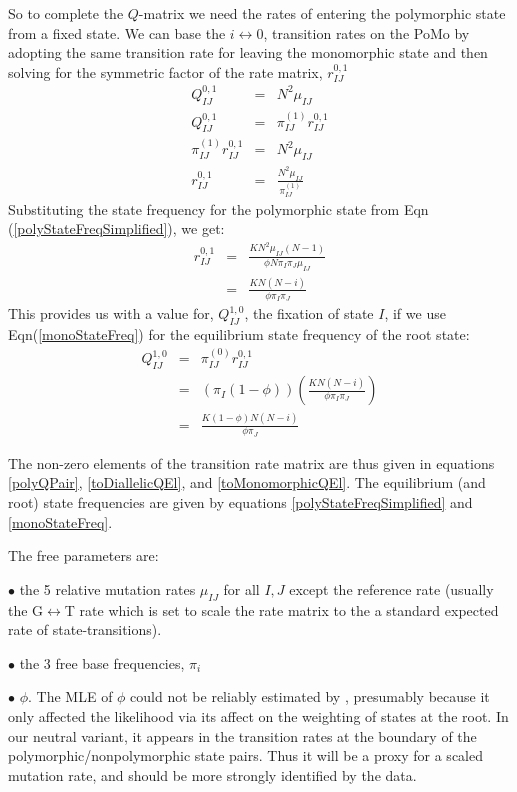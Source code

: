 \documentclass{llncs}
\newcommand{\polyProb}{\ensuremath{\phi}}}
\newcommand{\Knorm}{\ensuremath{K}}}
\newcommand{\pomo}{PoMo\xspace}
\begin{document}
So to complete the $Q$-matrix we need the rates of entering the polymorphic state from a fixed state.
We can base the $i\leftrightarrow 0$, transition rates on the \pomo by adopting 
    the same transition rate for leaving the monomorphic state and
    then solving for the symmetric factor of the rate matrix, $r_{IJ}^{0,1}$
\begin{eqnarray}
    Q_{IJ}^{0,1} & = & N^2 \mu_{IJ}  \label{toDiallelicQEl}\\
    Q_{IJ}^{0,1} & = & \pi_{IJ}^{(1)} r_{IJ}^{0,1} \nonumber\\
    \pi_{IJ}^{(1)} r_{IJ}^{0,1}& = & N^2 \mu_{IJ}  \nonumber \\
    r_{IJ}^{0,1}& = & \frac{N^2 \mu_{IJ}}{\pi_{IJ}^{(1)}}
\end{eqnarray}
Substituting the state frequency for the polymorphic state from Eqn (\ref{polyStateFreqSimplified}), we get:
\begin{eqnarray}
    r_{IJ}^{0,1} & = & \frac{\Knorm N^2 \mu_{IJ}(N-1)}{\polyProb N\pi_I\pi_J\mu_{IJ}} \nonumber \\
                 & = & \frac{\Knorm N(N-i)}{\polyProb \pi_I\pi_J} 
\end{eqnarray}
This provides us with a value for, $Q_{IJ}^{1,0}$, the fixation of state $I$, if we use Eqn(\ref{monoStateFreq}) for the equilibrium state frequency of the root state:
\begin{eqnarray}
    Q_{IJ}^{1,0} & = & \pi_{IJ}^{(0)} r_{IJ}^{0,1} \nonumber \\
                 & = & \left(\pi_I(1-\polyProb)\right)\left(\frac{\Knorm N(N-i)}{\polyProb \pi_I\pi_J} \right) \nonumber \\
                 & = & \frac{\Knorm (1-\polyProb)N(N-i)}{\polyProb \pi_J} \label{toMonomorphicQEl}
\end{eqnarray}

The non-zero elements of the transition rate matrix are thus given in equations \ref{polyQPair}, \ref{toDiallelicQEl}, and \ref{toMonomorphicQEl}.
The equilibrium (and root) state frequencies are given by equations \ref{polyStateFreqSimplified} and \ref{monoStateFreq}.

The free parameters are:
\begin{compactitem}
    \item[$\bullet$] the 5 relative mutation rates $\mu_{IJ}$ for all $I,J$ except the reference rate (usually the G$\leftrightarrow$T rate which is set to scale the rate matrix to the a standard expected rate of state-transitions).
    \item[$\bullet$] the 3 free base frequencies, $\pi_i$
    \item[$\bullet$] $\polyProb$. The MLE of $\polyProb$ could not be reliably estimated by \cite{DeMaioSK2013}, presumably because it only
    affected the likelihood via its affect on the weighting of states at the root.
    In our neutral variant, it appears in the transition rates at the boundary of the polymorphic/nonpolymorphic state pairs.
    Thus it will be a proxy for a scaled mutation rate, and should be more strongly identified by the data.
\end{compactitem}
\end{document}
